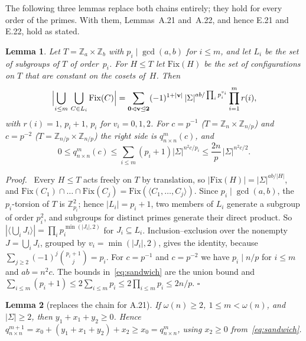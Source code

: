 \documentclass[10pt,twocolumn,letterpaper]{article}
\newcommand{\ZZ}{\mathbb{Z}}
\newcommand{\sig}{|\Sigma|}
\newcommand{\vv}{\mathbf v}
\newtheorem{lemma}{Lemma}
\newenvironment{proofR}{\par\noindent\textit{Proof.}\ }{\hfill$\square$\par\medskip}
\begin{document}
\begin{enumerate}[leftmargin=*,label=\arabic*.,itemsep=0.5ex]
The following three lemmas replace both chains entirely; they hold for every
order of the primes. With them, Lemmas~A.21 and~A.22, and hence E.21 and
E.22, hold as stated.

\begin{lemma}\label{lem:union}
Let $T=\ZZ_a\times\ZZ_b$ with $p_i\mid\gcd(a,b)$ for $i\le m$, and let
$L_i$ be the set of subgroups of $T$ of order~$p_i$. For $H\le T$ let
$\mathrm{Fix}(H)$ be the set of configurations on $T$ that are constant on
the cosets of~$H$. Then
\[
  \Bigl|\bigcup_{i\le m}\,\bigcup_{C\in L_i}\mathrm{Fix}(C)\Bigr|
  =\sum_{\mathbf 0\lhd\vv\unlhd\mathbf 2}(-1)^{1+|\vv|}\,
  \sig^{ab/\prod_i p_i^{v_i}}\prod_{i=1}^m r(i),
\]
with $r(i)=1,\,p_i{+}1,\,p_i$ for $v_i=0,1,2$. For $c=p^{-1}$
($T=\ZZ_n\times\ZZ_{n/p}$) and $c=p^{-2}$ ($T=\ZZ_{n/p}\times\ZZ_{n/p}$)
the right side is $q^m_{n\times n}(c)$, and
\begin{equation}\label{eq:sandwich}\tag{$\ast$}
  0\le q^m_{n\times n}(c)\le\sum_{i\le m}(p_i{+}1)\sig^{n^2c/p_i}
  \le\frac{2n}{p}\,\sig^{n^2c/2}.
\end{equation}
\end{lemma}

\begin{proofR}
Every $H\le T$ acts freely on $T$ by translation, so
$|\mathrm{Fix}(H)|=\sig^{ab/|H|}$, and
$\mathrm{Fix}(C_1)\cap\dots\cap\mathrm{Fix}(C_j)
=\mathrm{Fix}(\langle C_1,\dots,C_j\rangle)$. Since $p_i\mid\gcd(a,b)$, the
$p_i$-torsion of $T$ is $\ZZ_{p_i}^2$; hence $|L_i|=p_i+1$, two members
of $L_i$ generate a subgroup of order $p_i^2$, and subgroups for distinct
primes generate their direct product. So
$|\langle\bigcup_iJ_i\rangle|=\prod_ip_i^{\min(|J_i|,2)}$ for
$J_i\subseteq L_i$. Inclusion--exclusion over the nonempty
$J=\bigcup_iJ_i$, grouped by $v_i=\min(|J_i|,2)$, gives the identity,
because $\sum_{j\ge2}(-1)^j\binom{p_i+1}{j}=p_i$. For $c=p^{-1}$ and
$c=p^{-2}$ we have $p_i\mid n/p$ for $i\le m$ and $ab=n^2c$. The bounds
in~\eqref{eq:sandwich} are the union bound and
$\sum_{i\le m}(p_i{+}1)\le2\sum_{i\le m}p_i\le2\prod_{i\le m}p_i\le2n/p$.
\end{proofR}

\begin{lemma}[replaces the chain for A.21]\label{lem:r2}
If $\omega(n)\ge2$, $1\le m<\omega(n)$, and $\sig\ge2$, then
$y_1+x_1+y_2\ge0$. Hence
$q^{m+1}_{n\times n}=x_0+(y_1{+}x_1{+}y_2)+x_2\ge x_0=q^m_{n\times n}$,
using $x_2\ge0$ from~\eqref{eq:sandwich}.
\end{lemma}


\end{enumerate}
\end{document}
